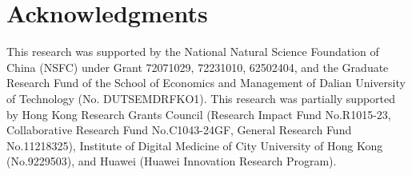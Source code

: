 \documentclass[letterpaper]{article} %
\begin{document}
\begin{links}
\end{links}








\section*{Acknowledgments}
This research was supported by the National Natural Science Foundation of China (NSFC) under Grant 72071029, 72231010, 62502404, and the Graduate Research Fund of the School of Economics and Management of Dalian University of Technology (No. DUTSEMDRFKO1). This research was partially supported by Hong Kong Research Grants Council (Research Impact Fund No.R1015-23, Collaborative Research Fund No.C1043-24GF, General Research Fund No.11218325), Institute of Digital Medicine of City University of Hong Kong (No.9229503), and Huawei (Huawei Innovation Research Program).

\nocite{*}

% 



\end{document}
